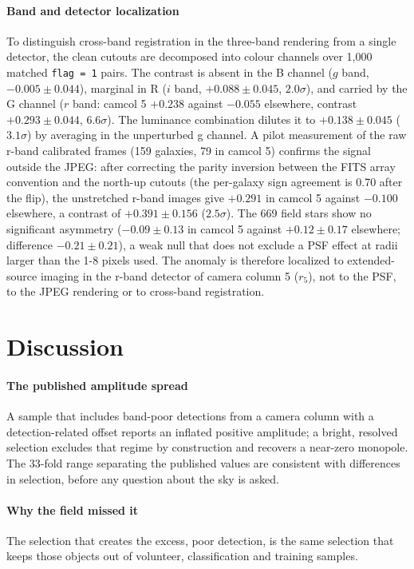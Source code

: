 \documentclass[preprint,12pt,authoryear]{elsarticle}
\begin{document}
\paragraph{Band and detector localization} To distinguish cross-band registration in the three-band
rendering from a single detector, the clean cutouts are decomposed into colour channels over 1,000
matched \texttt{flag = 1} pairs. The contrast is absent in the B channel ($g$ band, $-0.005 \pm 0.044$),
marginal in R ($i$ band, $+0.088 \pm 0.045$, $2.0\sigma$), and carried by the G channel ($r$ band:
camcol 5 $+0.238$ against $-0.055$ elsewhere, contrast $+0.293 \pm 0.044$, $6.6\sigma$). The luminance
combination dilutes it to $+0.138 \pm 0.045$ ($3.1\sigma$) by averaging in the unperturbed g channel.
A pilot measurement of the raw r-band calibrated frames (159 galaxies, 79 in camcol 5) confirms the
signal outside the JPEG: after correcting the parity inversion between the FITS array convention
and the north-up cutouts (the per-galaxy sign agreement is 0.70 after the flip), the unstretched
r-band images give $+0.291$ in camcol 5 against $-0.100$ elsewhere, a contrast of
$+0.391 \pm 0.156$ ($2.5\sigma$). The 669 field stars show no significant asymmetry ($-0.09 \pm 0.13$ in
camcol 5 against $+0.12 \pm 0.17$ elsewhere; difference $-0.21 \pm 0.21$), a weak null that does not
exclude a PSF effect at radii larger than the 1-8 pixels used. The anomaly is therefore
localized to extended-source imaging in the r-band detector of camera column 5 ($r_5$), not to the
PSF, to the JPEG rendering or to cross-band registration.

\section{Discussion}
\paragraph{The published amplitude spread} A sample that includes band-poor detections from a
camera column with a detection-related offset reports an inflated positive amplitude; a bright,
resolved selection excludes that regime by construction and recovers a near-zero monopole. The 33-fold range separating the published values are consistent with differences in selection,
before any question about the sky is asked.

\paragraph{Why the field missed it} The selection that creates the excess, poor detection, is the
same selection that keeps those objects out of volunteer, classification and training samples.
\end{document}
